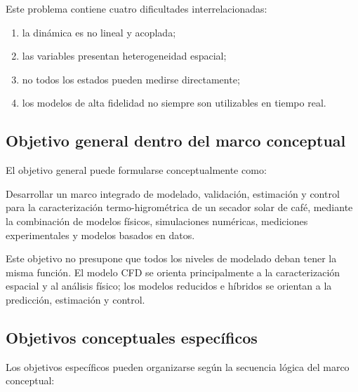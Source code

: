 Este problema contiene cuatro dificultades interrelacionadas:

\begin{enumerate}
    \item la dinámica es no lineal y acoplada;
    \item las variables presentan heterogeneidad espacial;
    \item no todos los estados pueden medirse directamente;
    \item los modelos de alta fidelidad no siempre son utilizables en tiempo real.
\end{enumerate}

\subsection{Objetivo general dentro del marco conceptual}
\label{subsec:objetivo_general_marco}

El objetivo general puede formularse conceptualmente como:

\begin{tcolorbox}[
title=Objetivo general,
colback=blue!3,
colframe=blue!60!black,
boxrule=0.8pt,
arc=2mm
]
Desarrollar un marco integrado de modelado, validación, estimación y control para la caracterización termo-higrométrica de un secador solar de café, mediante la combinación de modelos físicos, simulaciones numéricas, mediciones experimentales y modelos basados en datos.
\end{tcolorbox}

Este objetivo no presupone que todos los niveles de modelado deban tener la misma función. El modelo CFD se orienta principalmente a la caracterización espacial y al análisis físico; los modelos reducidos e híbridos se orientan a la predicción, estimación y control.

\subsection{Objetivos conceptuales específicos}
\label{subsec:objetivos_conceptuales}

Los objetivos específicos pueden organizarse según la secuencia lógica del marco conceptual:

